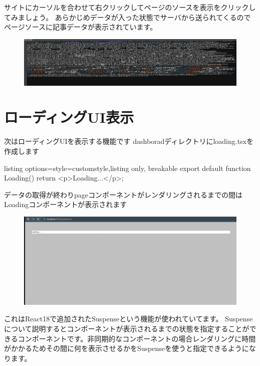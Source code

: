 サイトにカーソルを合わせて右クリックしてページのソースを表示をクリックしてみましょう。
あらかじめデータが入った状態でサーバから送られてくるのでページソースに記事データが表示されています。

\begin{figure}[H]
  \centering
  \includegraphics[width=12cm]{./image/03-Tech/chap4/05.png}
\end{figure}

\section{ローディングUI表示}

次はローディングUIを表示する機能です
dashboradディレクトリにloading.tsxを作成します

\begin{tcblisting}{listing options={style=customstyle},listing only, breakable}
  export default function Loading() {
      return <p>Loading...</p>;
    }
\end{tcblisting}


データの取得が終わりpageコンポーネントがレンダリングされるまでの間はLoadingコンポーネントが表示されます

\begin{figure}[H]
  \centering
  \includegraphics[width=12cm]{./image/03-Tech/chap4/07.png}
\end{figure}




これはReact18で追加されたSuspenseという機能が使われていてます。
Suspenseについて説明するとコンポーネントが表示されるまでの状態を指定することができるコンポーネントです。非同期的なコンポーネントの場合レンダリングに時間がかかるためその間に何を表示させるかをSuspenseを使うと指定できるようになります。

